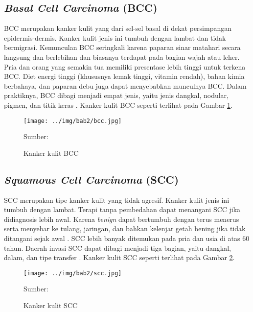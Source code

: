     \subsection{\textit{Basal Cell Carcinoma} (BCC)}
    BCC merupakan kanker kulit yang dari sel-sel basal di dekat persimpangan epidermis-dermis. Kanker kulit jenis ini tumbuh dengan lambat dan tidak bermigrasi. Kemunculan BCC seringkali karena paparan sinar matahari secara langsung dan berlebihan dan biasanya terdapat pada bagian wajah atau leher. Pria dan orang yang semakin tua memiliki presentase lebih tinggi untuk terkena BCC. Diet energi tinggi (khususnya lemak tinggi, vitamin rendah), bahan kimia berbahaya, dan paparan debu juga dapat menyebabkan munculnya BCC. Dalam praktiknya, BCC dibagi menjadi empat jenis, yaitu jenis dangkal, nodular, pigmen, dan titik keras \citep{Sang2019}. Kanker kulit BCC seperti terlihat pada Gambar \ref{fig:bcc}.
    \begin{figure}[H] 
        \begin{center} 
            \texttt{[image: ../img/bab2/bcc.jpg]}
            \caption{Kanker kulit BCC} 
            \label{fig:bcc}
            Sumber: \citep{Codella2018,Combalia2019,Tschandl2018}
        \end{center} 
    \end{figure}

    \subsection{\textit{Squamous Cell Carcinoma} (SCC)}
    SCC merupakan tipe kanker kulit yang tidak agresif. Kanker kulit jenis ini tumbuh dengan lambat. Terapi tanpa pembedahan dapat menangani SCC jika didiagnosis lebih awal. Karena \textit{benign} dapat bertumbuh dengan terus menerus serta menyebar ke tulang, jaringan, dan bahkan kelenjar getah bening jika tidak ditangani sejak awal \citep{Fuadah2020a}. SCC lebih banyak ditemukan pada pria dan usia di atas 60 tahun. Daerah invasi SCC dapat dibagi menjadi tiga bagian, yaitu dangkal, dalam, dan tipe transfer \citep{Sang2019}. Kanker kulit SCC seperti terlihat pada Gambar \ref{fig:scc}.
    \begin{figure}[H] 
        \begin{center} 
            \texttt{[image: ../img/bab2/scc.jpg]}
            \caption{Kanker kulit SCC} 
            \label{fig:scc}
            Sumber: \citep{Codella2018,Combalia2019,Tschandl2018}
        \end{center} 
    \end{figure}

